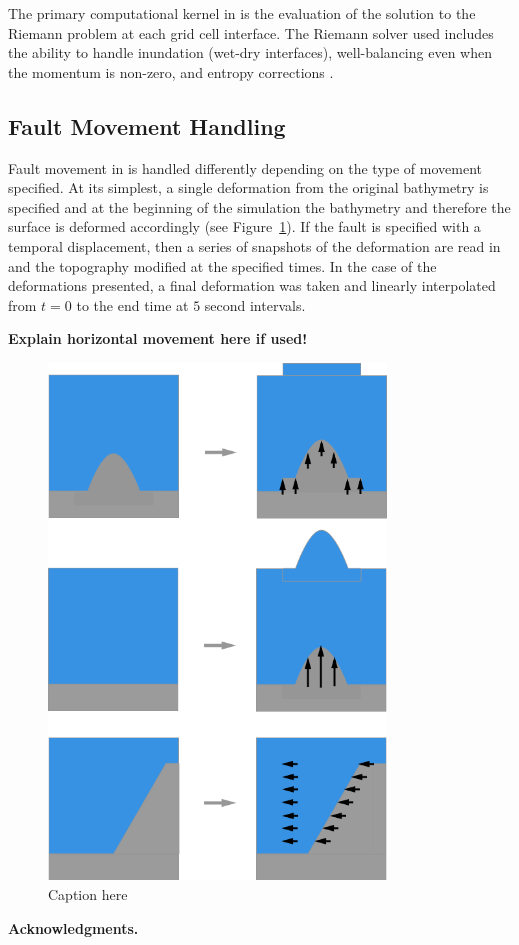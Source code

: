 \documentclass[preprint,review,12pt]{elsarticle}
\newcommand{\alert}[1]{\textbf{\color{red} #1}}
\begin{document}
The primary computational kernel in \geoclaw is the evaluation of the solution to the Riemann problem at each grid cell interface.  The Riemann solver used includes the ability to handle inundation (wet-dry interfaces), well-balancing even when the momentum is non-zero, and entropy corrections \cite{George:2008aa}.

\subsection{Fault Movement Handling}

Fault movement in \geoclaw is handled differently depending on the type of movement specified.  At its simplest, a single deformation from the original bathymetry is specified and at the beginning of the simulation the bathymetry and therefore the surface is deformed accordingly (see Figure~\ref{fig:fault_movement_diagram}).  If the fault is specified with a temporal displacement, then a series of snapshots of the deformation are read in and the topography modified at the specified times.  In the case of the deformations presented, a final deformation was taken and linearly interpolated from $t=0$ to the end time at $5$ second intervals.

\alert{Explain horizontal movement here if used!}

\begin{figure}[tb]
    \begin{center}
        \includegraphics[width=0.8\textwidth]{earth_quake_tsunami_source.png}
    \end{center}
    \caption{Caption here}
    \label{fig:fault_movement_diagram}
\end{figure}

\vskip 10pt
{\bf Acknowledgments.}




\end{document}
